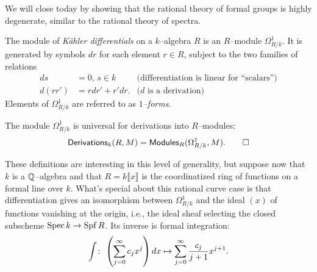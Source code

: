 We will close today by showing that the rational theory of formal groups is highly degenerate, similar to the rational theory of spectra.

\begin{definition}
The module of \textit{K\"ahler differentials} on a $k$--algebra $R$ is an $R$--module $\Omega^1_{R/k}$.  It is generated by symbols $dr$ for each element $r \in R$, subject to the two families of relations
\begin{align*}
ds & = 0, \, s \in k & \text{(differentiation is linear for ``scalars'')} \\
d(rr') & = rdr' + r'dr. & \text{($d$ is a derivation)}
\end{align*}
Elements of $\Omega^1_{R/k}$ are referred to as \textit{$1$--forms}.
\end{definition}

\begin{lemma}
The module $\Omega^1_{R/k}$ is universal for derivations into $R$--modules: \[\mathsf{Derivations}_k(R, M) = \mathsf{Modules}_R(\Omega^1_{R/k}, M). \qed\]
\end{lemma}

These definitions are interesting in this level of generality, but suppose now that $k$ is a $\mathbb{Q}$--algebra and that $R = k\llbracket x \rrbracket$ is the coordinatized ring of functions on a formal line over $k$.  What's special about this rational curve case is that differentiation gives an isomorphism between $\Omega^1_{R/k}$ and the ideal $(x)$ of functions vanishing at the origin, i.e., the ideal sheaf selecting the closed subscheme $\operatorname{Spec} k \to \operatorname{Spf} R$.  Its inverse is formal integration: \[\int \colon\thinspace \left(\sum_{j=0}^\infty c_j x^j \right) dx \mapsto \sum_{j=0}^\infty \frac{c_j}{j+1} x^{j+1}.\]

